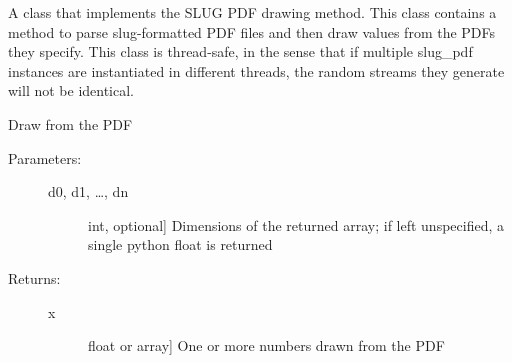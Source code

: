 \documentclass[letterpaper,10pt,english]{sphinxmanual}
\begin{document}

\begin{fulllineitems}
\label{\detokenize{slugpy:slugpy.slug_pdf}}
A class that implements the SLUG PDF drawing method. This class
contains a method to parse slug-formatted PDF files and then draw
values from the PDFs they specify. This class is thread-safe, in
the sense that if multiple slug\_pdf instances are instantiated in
different threads, the random streams they generate will not be
identical.

\begin{fulllineitems}
\label{\detokenize{slugpy:slugpy.slug_pdf.draw}}
Draw from the PDF
\begin{description}
\item[{Parameters:}] \leavevmode\begin{description}
\item[{d0, d1, …, dn}] \leavevmode{[}int, optional{]}
Dimensions of the returned array; if left unspecified, a
single python float is returned

\end{description}

\item[{Returns:}] \leavevmode\begin{description}
\item[{x}] \leavevmode{[}float or array{]}
One or more numbers drawn from the PDF

\end{description}

\end{description}

\end{fulllineitems}


\end{fulllineitems}

\end{document}
